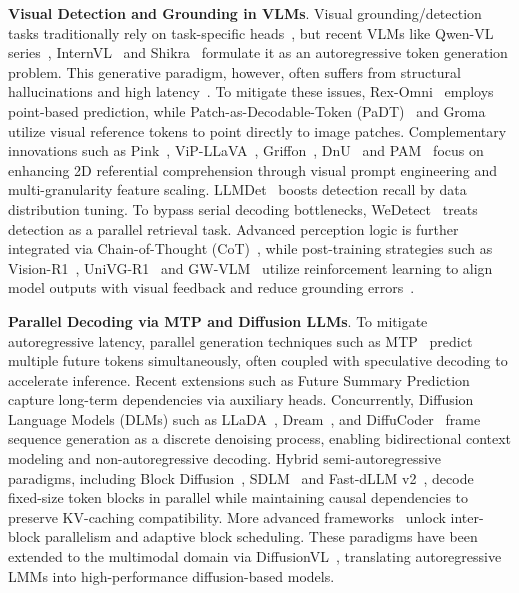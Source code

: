 \documentclass{llmxive}
\begin{document}
\textbf{Visual Detection and Grounding in VLMs}. Visual grounding/detection tasks traditionally rely on task-specific heads~\citep{carion2020end, liu2024grounding, ren2016faster, jiang2024far3d}, but recent VLMs like Qwen-VL series~\citep{bai2025qwen2.5vl, bai2025qwen3vltechnicalreport}, InternVL~\citep{chen2024internvl} and Shikra~\citep{chen2023shikra} formulate it as an autoregressive token generation problem. This generative paradigm, however, often suffers from structural hallucinations and high latency~\citep{li2023evaluating}. To mitigate these issues, Rex-Omni~\citep{jiang2025rexomni} employs point-based prediction, while Patch-as-Decodable-Token (PaDT)~\citep{su2026patch} and Groma~\citep{ma2024groma} utilize visual reference tokens to point directly to image patches. Complementary innovations such as Pink~\citep{xuan2024pink}, ViP-LLaVA~\citep{cai2024vipllava}, Griffon~\citep{zhan2024griffon},  DnU~\citep{lin2024draw} and PAM~\citep{lin2025perceive} focus on enhancing 2D referential comprehension through visual prompt engineering and multi-granularity feature scaling.
LLMDet~\citep{fu2025llmdet} boosts detection recall by data distribution tuning. To bypass serial decoding bottlenecks, WeDetect~\citep{fu2025wedetect} treats detection as a parallel retrieval task. Advanced perception logic is further integrated via Chain-of-Thought (CoT)~\citep{qi2025cot4det}, while post-training strategies such as Vision-R1~\citep{zhan2025visionr1}, UniVG-R1~\citep{bai2025univg} and GW-VLM~\citep{jiang2026gwvlm} utilize reinforcement learning to align model outputs with visual feedback and reduce grounding errors~\citep{zhang2024ferretv2}.

\noindent\textbf{Parallel Decoding via MTP and Diffusion LLMs}.
To mitigate autoregressive latency, parallel generation techniques such as MTP~\citep{gloeckle2024better, cai2024medusa, samragh2025your} predict multiple future tokens simultaneously, often coupled with speculative decoding to accelerate inference. Recent extensions such as Future Summary Prediction~\citep{mahajan2025beyond} capture long-term dependencies via auxiliary heads. Concurrently, Diffusion Language Models (DLMs) such as LLaDA~\citep{nie2025large}, Dream~\citep{ye2025dream}, and DiffuCoder~\citep{gong2025diffucoder} frame sequence generation as a discrete denoising process, enabling bidirectional context modeling and non-autoregressive decoding. Hybrid semi-autoregressive paradigms, including Block Diffusion~\citep{arriola2025block}, SDLM~\citep{liu2025sequential} and Fast-dLLM v2~\citep{wu2025fast}, decode fixed-size token blocks in parallel while maintaining causal dependencies to preserve KV-caching compatibility. More advanced frameworks~\citep{wang2025diffusion, lu2025adablock} unlock inter-block parallelism and adaptive block scheduling. These paradigms have been extended to the multimodal domain via DiffusionVL~\citep{li2025diffusionvl}, translating autoregressive LMMs into high-performance diffusion-based models.
\end{document}
